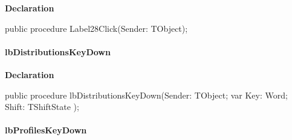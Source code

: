 \documentclass{report}
\newif\ifpdf
\begin{document}
\label{prjwizard.TfrmProjectWizard-Label28Click}
\begin{list}{}{
\setlength{\itemindent}{0cm}
\setlength{\listparindent}{0cm}
\setlength{\leftmargin}{\evensidemargin}
\addtolength{\leftmargin}{\tmplength}
\settowidth{\labelsep}{X}
\addtolength{\leftmargin}{\labelsep}
\setlength{\labelwidth}{\tmplength}
}
\item[\textbf{Declaration}\hfill]
\ifpdf
\begin{flushleft}
\fi
\begin{ttfamily}
public procedure Label28Click(Sender: TObject);\end{ttfamily}

\ifpdf
\end{flushleft}
\fi

\end{list}
\paragraph*{lbDistributionsKeyDown}\hspace*{\fill}

\label{prjwizard.TfrmProjectWizard-lbDistributionsKeyDown}
\begin{list}{}{
\setlength{\itemindent}{0cm}
\setlength{\listparindent}{0cm}
\setlength{\leftmargin}{\evensidemargin}
\addtolength{\leftmargin}{\tmplength}
\settowidth{\labelsep}{X}
\addtolength{\leftmargin}{\labelsep}
\setlength{\labelwidth}{\tmplength}
}
\item[\textbf{Declaration}\hfill]
\ifpdf
\begin{flushleft}
\fi
\begin{ttfamily}
public procedure lbDistributionsKeyDown(Sender: TObject; var Key: Word; Shift: TShiftState );\end{ttfamily}

\ifpdf
\end{flushleft}
\fi

\end{list}
\paragraph*{lbProfilesKeyDown}\hspace*{\fill}
\end{document}
